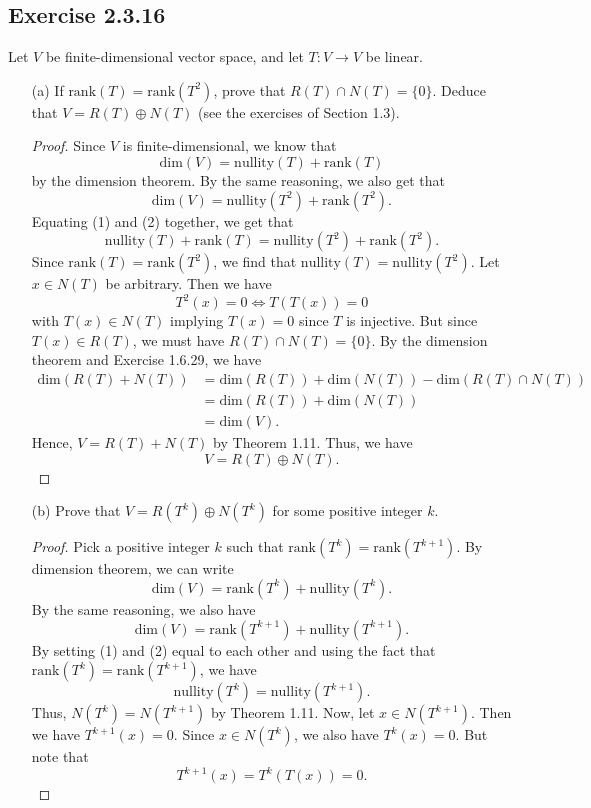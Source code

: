 \subsection*{Exercise 2.3.16} Let \( V  \) be finite-dimensional vector space, and let \( T: V \to V  \) be linear.
\begin{enumerate}
    \item[(a)] If \( \text{rank}(T) = \text{rank}(T^{2}) \), prove that \( R(T) \cap N(T) = \{ 0  \}   \). Deduce that \( V = R(T) \oplus N(T)  \) (see the exercises of Section 1.3).
        \begin{proof}
        Since \( V  \) is finite-dimensional, we know that 
        \[  \text{dim}(V) = \text{nullity}(T) + \text{rank}(T) \tag{1} \]
            by the dimension theorem. By the same reasoning, we also get that
            \[  \text{dim}(V) = \text{nullity}(T^{2}) + \text{rank}(T^{2}). \tag{2} \]
            Equating (1) and (2) together, we get that
            \[  \text{nullity}(T) + \text{rank}(T) = \text{nullity}(T^{2}) + \text{rank}(T^{2}). \]
            Since \( \text{rank}(T) = \text{rank}(T^{2} )  \), we find that \( \text{nullity}(T) = \text{nullity}(T^{2}) \). Let \( x \in N(T)  \) be arbitrary. Then we have 
            \[  T^{2}(x) = 0 \iff T(T(x)) = 0  \]
            with \( T(x) \in N(T)  \) implying \( T(x) = 0  \) since \( T  \) is injective. But since \( T(x) \in R(T)  \), we must have \( R(T) \cap N(T) = \{ 0  \}  \). By the dimension theorem and Exercise 1.6.29, we have
            \begin{align*}
                \text{dim}(R(T) + N(T)) &= \text{dim}(R(T)) + \text{dim}(N(T)) - \text{dim}(R(T) \cap N(T)) \\
                                        &=  \text{dim}(R(T)) + \text{dim}(N(T)) \\
                                        &= \text{dim}(V).
            \end{align*}
Hence, \( V = R(T) + N(T)  \) by Theorem 1.11. Thus, we have
\[  V = R(T) \oplus N(T). \]
        \end{proof}
    \item[(b)] Prove that \( V = R(T^{k }) \oplus N(T^{k }) \) for some positive integer \( k  \).
        \begin{proof}
            Pick a positive integer \( k  \) such that \( \text{rank}(T^{k }) = \text{rank}(T^{k+1})  \). By dimension theorem, we can write 
            \[  \text{dim}(V) = \text{rank}(T^{k }) + \text{nullity}(T^{k }). \tag{1}\] By the same reasoning, we also have
            \[  \text{dim}(V) = \text{rank}(T^{k+1}) + \text{nullity}(T^{k + 1 }). \tag{2} \] By setting (1) and (2) equal to each other and using the fact that \( \text{rank}(T^{k } ) = \text{rank}(T^{k+1}) \), we have
            \[  \text{nullity}(T^{k }) = \text{nullity}(T^{k+1}).  \]
            Thus, \( N(T^{k }) = N(T^{k+1}) \) by Theorem 1.11. Now, let \( x \in N(T^{k+1})  \). Then we have \( T^{k+1}(x) = 0  \). Since \( x \in N(T^{k }) \), we also have \( T^{k } (x) = 0  \). But note that 
            \[  T^{k+1}(x) = T^{k }(T(x)) = 0. \]
        \end{proof}
\end{enumerate}

